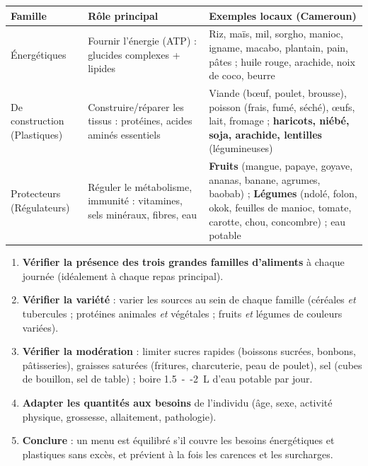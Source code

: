 \documentclass[11pt]{article}
\newcommand{\cle}[1]{{\popxbold\color{popdark}#1}}
\begin{document}
\begin{propriete}
\begin{center}
\begin{tabularx}{\linewidth}{|l|X|X|}
\hline
\rowcolor{popblueL} \textbf{Famille} & \textbf{Rôle principal} & \textbf{Exemples locaux (Cameroun)} \\
\hline
\cle{Énergétiques} & Fournir l'énergie (ATP) : glucides complexes + lipides & Riz, maïs, mil, sorgho, manioc, igname, macabo, plantain, pain, pâtes ; huile rouge, arachide, noix de coco, beurre \\
\hline
\cle{De construction (Plastiques)} & Construire/réparer les tissus : protéines, acides aminés essentiels & Viande (bœuf, poulet, brousse), poisson (frais, fumé, séché), œufs, lait, fromage ; \textbf{haricots, niébé, soja, arachide, lentilles} (légumineuses) \\
\hline
\cle{Protecteurs (Régulateurs)} & Réguler le métabolisme, immunité : vitamines, sels minéraux, fibres, eau & \textbf{Fruits} (mangue, papaye, goyave, ananas, banane, agrumes, baobab) ; \textbf{Légumes} (ndolé, folon, okok, feuilles de manioc, tomate, carotte, chou, concombre) ; eau potable \\
\hline
\end{tabularx}
\end{center}
\end{propriete}

\begin{methode}
\begin{enumerate}
\item \textbf{Vérifier la présence des trois grandes familles d'aliments} à chaque journée (idéalement à chaque repas principal).
\item \textbf{Vérifier la variété} : varier les sources au sein de chaque famille (céréales \emph{et} tubercules ; protéines animales \emph{et} végétales ; fruits \emph{et} légumes de couleurs variées).
\item \textbf{Vérifier la modération} : limiter sucres rapides (boissons sucrées, bonbons, pâtisseries), graisses saturées (fritures, charcuterie, peau de poulet), sel (cubes de bouillon, sel de table) ; boire \SI{1,5}{--}\SI{2}{L} d'eau potable par jour.
\item \textbf{Adapter les quantités aux besoins} de l'individu (âge, sexe, activité physique, grossesse, allaitement, pathologie).
\item \textbf{Conclure} : un menu est équilibré s'il couvre les besoins énergétiques et plastiques sans excès, et prévient à la fois les carences et les surcharges.
\end{enumerate}
\end{methode}
\end{document}
